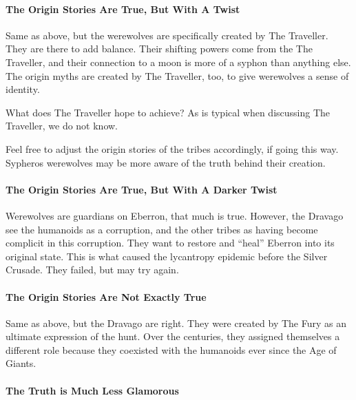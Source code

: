 \documentclass[twocolumn]{dndbook}
\begin{document}
\paragraph*{The Origin Stories Are True, But With A Twist}

Same as above, but the werewolves are specifically created by The Traveller.
They are there to add balance.
Their shifting powers come from the The Traveller, and their connection to a moon is more of a syphon than anything else.
The origin myths are created by The Traveller, too, to give werewolves a sense of identity.\par

What does The Traveller hope to achieve? As is typical when discussing The Traveller, we do not know.\par

Feel free to adjust the origin stories of the tribes accordingly, if going this way. Sypheros werewolves may be more aware of the truth behind their creation.\par

\paragraph*{The Origin Stories Are True, But With A Darker Twist}

Werewolves are guardians on Eberron, that much is true.
However, the Dravago see the humanoids as a corruption, and the other tribes as having become complicit in this corruption.
They want to restore and ``heal'' Eberron into its original state.
This is what caused the lycantropy epidemic before the Silver Crusade.
They failed, but may try again.\par

\paragraph*{The Origin Stories Are Not Exactly True}

Same as above, but the Dravago are right.
They were created by The Fury as an ultimate expression of the hunt.
Over the centuries, they assigned themselves a different role because they coexisted with the humanoids ever since the Age of Giants.\par


\paragraph*{The Truth is Much Less Glamorous}
\end{document}
